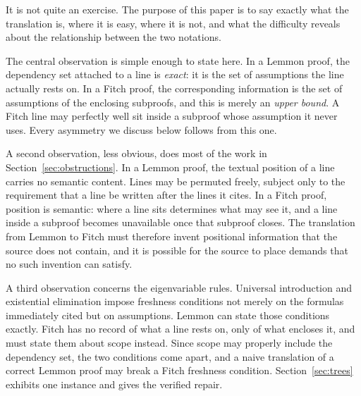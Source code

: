 \documentclass[11pt]{article}
\theoremstyle{plain}
\theoremstyle{definition}
\theoremstyle{remark}
\begin{document}
It is not quite an exercise. The purpose of this paper is to say exactly what
the translation is, where it is easy, where it is not, and what the difficulty
reveals about the relationship between the two notations.

The central observation is simple enough to state here. In a Lemmon proof, the
dependency set attached to a line is \emph{exact}: it is the set of
assumptions the line actually rests on. In a Fitch proof, the corresponding
information is the set of assumptions of the enclosing subproofs, and this is
merely an \emph{upper bound}. A Fitch line may perfectly well sit inside a
subproof whose assumption it never uses. Every asymmetry we discuss below
follows from this one.

A second observation, less obvious, does most of the work in
Section~\ref{sec:obstructions}. In a Lemmon proof, the textual position of a
line carries no semantic content. Lines may be permuted freely, subject only
to the requirement that a line be written after the lines it cites. In a Fitch
proof, position is semantic: where a line sits determines what may see it, and
a line inside a subproof becomes unavailable once that subproof closes. The
translation from Lemmon to Fitch must therefore invent positional information
that the source does not contain, and it is possible for the source to place
demands that no such invention can satisfy.

A third observation concerns the eigenvariable rules. Universal introduction
and existential elimination impose freshness conditions not merely on the
formulas immediately cited but on assumptions. Lemmon can state those
conditions exactly. Fitch has no record of what a line rests on, only of what
encloses it, and must state them about scope instead. Since scope may properly
include the dependency set, the two conditions come apart, and a naive
translation of a correct Lemmon proof may break a Fitch freshness condition.
Section~\ref{sec:trees} exhibits one instance and gives the verified repair.
\end{document}
